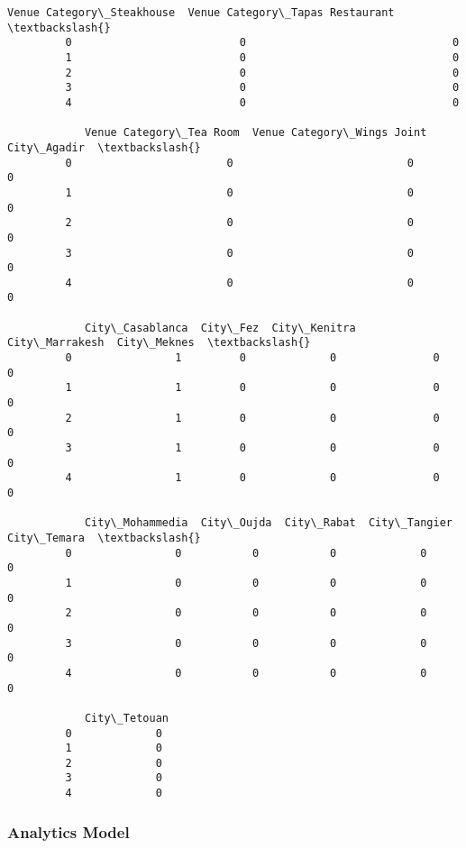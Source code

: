 \documentclass[11pt]{article}
\begin{document}
\begin{Verbatim}[commandchars=\\\{\}]
            Venue Category\_Steakhouse  Venue Category\_Tapas Restaurant  \textbackslash{}
         0                          0                                0   
         1                          0                                0   
         2                          0                                0   
         3                          0                                0   
         4                          0                                0   
         
            Venue Category\_Tea Room  Venue Category\_Wings Joint  City\_Agadir  \textbackslash{}
         0                        0                           0            0   
         1                        0                           0            0   
         2                        0                           0            0   
         3                        0                           0            0   
         4                        0                           0            0   
         
            City\_Casablanca  City\_Fez  City\_Kenitra  City\_Marrakesh  City\_Meknes  \textbackslash{}
         0                1         0             0               0            0   
         1                1         0             0               0            0   
         2                1         0             0               0            0   
         3                1         0             0               0            0   
         4                1         0             0               0            0   
         
            City\_Mohammedia  City\_Oujda  City\_Rabat  City\_Tangier  City\_Temara  \textbackslash{}
         0                0           0           0             0            0   
         1                0           0           0             0            0   
         2                0           0           0             0            0   
         3                0           0           0             0            0   
         4                0           0           0             0            0   
         
            City\_Tetouan  
         0             0  
         1             0  
         2             0  
         3             0  
         4             0  
\end{Verbatim}
            
    \subsubsection{Analytics Model}\label{analytics-model}
\end{document}
